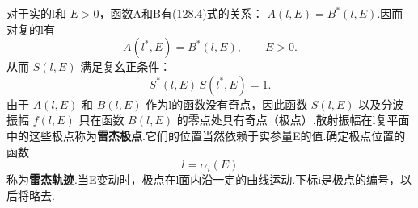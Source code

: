 对于实的l和 $E>0$，函数A和B有(128.4)式的关系：
$A(l,E)=B^{*}(l,E)$.因而对复的l有
\begin{equation}
  A(l^{*},E)=B^{*}(l,E),\qquad E>0.
\end{equation}
从而 $S(l,E)$ 满足复幺正条件：
\begin{equation}
  S^{*}(l,E)\,S(l^{*},E)=1.
\end{equation}
由于 $A(l,E)$ 和 $B(l,E)$ 作为l的函数没有奇点，因此函数 $S(l,E)$ 以及分波振幅 $f(l,E)$ 只在函数 $B(l,E)$ 的零点处具有奇点（极点）.散射振幅在l复平面中的这些极点称为\textbf{雷杰极点}.它们的位置当然依赖于实参量E的值.确定极点位置的函数
\begin{equation*}
  l=\alpha_i(E)
\end{equation*}
称为\textbf{雷杰轨迹}.当E变动时，极点在l面内沿一定的曲线运动.下标i是极点的编号，以后将略去.

